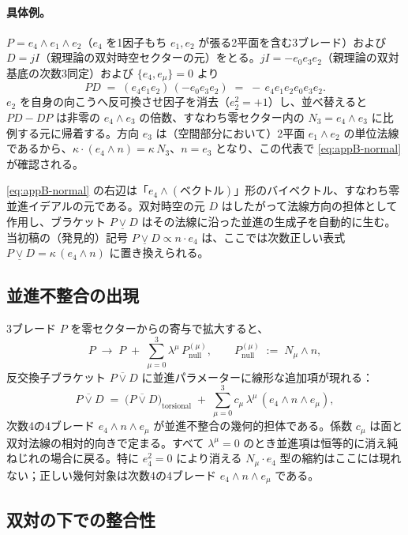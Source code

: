 \documentclass[11pt,a4paper]{article}
\begin{document}
\paragraph{具体例。}
$P = e_{4}\wedge e_{1}\wedge e_{2}$（$e_{4}$ を1因子もち $e_{1},e_{2}$ が張る2平面を含む3ブレード）および $D=jI$（親理論の双対時空セクターの元）をとる。$jI=-e_{0}e_{3}e_{2}$（親理論の双対基底の次数3同定）および $\{e_{4},e_{\mu}\}=0$ より
\[
PD \;=\; (e_{4}e_{1}e_{2})\,(-e_{0}e_{3}e_{2}) \;=\; -\,e_{4}e_{1}e_{2}e_{0}e_{3}e_{2}.
\]
$e_{2}$ を自身の向こうへ反可換させ因子を消去（$e_{2}^{2}=+1$）し、並べ替えると $PD-DP$ は非零の $e_{4}\wedge e_{3}$ の倍数、すなわち零セクター内の $N_{3}=e_{4}\wedge e_{3}$ に比例する元に帰着する。方向 $e_{3}$ は（空間部分において）2平面 $e_{1}\wedge e_{2}$ の単位法線であるから、$\kappa\cdot(e_{4}\wedge n) = \kappa\,N_{3}$、$n=e_{3}$ となり、この代表で \eqref{eq:appB-normal} が確認される。

\eqref{eq:appB-normal} の右辺は「$e_{4}\wedge(\text{ベクトル})$」形のバイベクトル、すなわち零並進イデアルの元である。双対時空の元 $D$ はしたがって法線方向の担体として作用し、ブラケット $P\mathbin{\underline{\vee}}D$ はその法線に沿った並進の生成子を自動的に生む。当初稿の（発見的）記号 $P\mathbin{\underline{\vee}}D\propto n\cdot e_{4}$ は、ここでは次数正しい表式 $P\mathbin{\underline{\vee}}D=\kappa\,(e_{4}\wedge n)$ に置き換えられる。

\subsection{並進不整合の出現}

3ブレード $P$ を零セクターからの寄与で拡大すると、
\[
P \;\to\; P \;+\; \sum_{\mu=0}^{3}\lambda^{\mu}\,P^{(\mu)}_{\text{null}},
\qquad
P^{(\mu)}_{\text{null}} \;:=\; N_{\mu}\wedge n,
\]
反交換子ブラケット $P\mathbin{\overline{\vee}}D$ に並進パラメーターに線形な追加項が現れる：
\[
P \mathbin{\overline{\vee}} D
\;=\; \bigl(P\mathbin{\overline{\vee}}D\bigr)_{\text{torsional}}
\;+\; \sum_{\mu=0}^{3} c_{\mu}\,\lambda^{\mu}\,(e_{4}\wedge n\wedge e_{\mu}),
\]
次数4の4ブレード $e_{4}\wedge n\wedge e_{\mu}$ が並進不整合の幾何的担体である。係数 $c_{\mu}$ は面と双対法線の相対的向きで定まる。すべて $\lambda^{\mu}=0$ のとき並進項は恒等的に消え純ねじれの場合に戻る。特に $e_{4}^{2}=0$ により消える $N_{\mu}\cdot e_{4}$ 型の縮約はここには現れない；正しい幾何対象は次数4の4ブレード $e_{4}\wedge n\wedge e_{\mu}$ である。

\subsection{双対の下での整合性}
\end{document}
